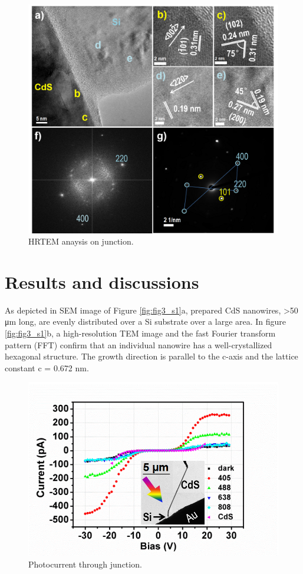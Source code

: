 \begin{figure}  
\includegraphics[width=\textwidth]{figures/figure3_2}
\caption[HRTEM anaysis on junction.]{HRTEM anaysis on junction.
\label{fig:fig3_2}}
\end{figure}


\section{Results and discussions}
As depicted in  SEM image of Figure \ref{fig:fig3_s1}a, prepared CdS nanowires, >50 μm long, are evenly distributed over a Si substrate over a large area. In figure \ref{fig:fig3_s1}b, a high-resolution TEM image and the fast Fourier transform pattern (FFT) confirm that an individual nanowire has a well-crystallized hexagonal structure. The growth direction is parallel to the c-axis and the lattice constant c = 0.672 nm. 

\begin{figure}  
\includegraphics[width=\textwidth]{figures/figure3_3}
\caption[Photocurrent through junction.]{Photocurrent through junction.
\label{fig:fig3_3}}
\end{figure}

